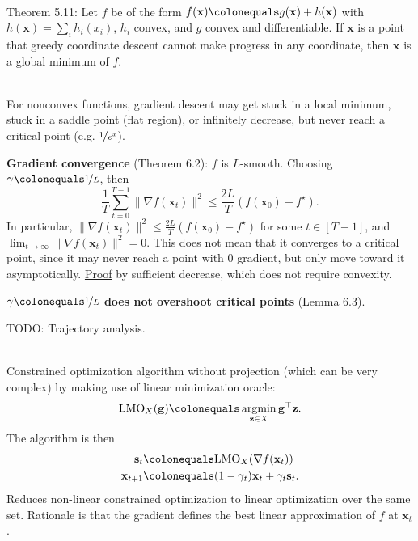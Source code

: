 \documentclass{article}
\DeclareMathOperator*{\argmin}{argmin}
\renewcommand{\vec}[1]{\mathbf{#1}}
\newcommand{\transpose}[1]{#1^\top}
\newenvironment{topic}[1]
{\textbf{\sffamily \colorbox{black}{\rlap{\textbf{\textcolor{white}{#1}}}\hspace{\linewidth}\hspace{-2\fboxsep}}} \\ \vspace{0.2cm}}
{}
\begin{document}
\begin{multicols*}{2}
\begin{topic}{5 Coordinate descent}
        Theorem 5.11: Let $f$ be of the form $f(\vec{x}) \colonequals g(\vec{x}) + h(\vec{x})$ with
        $h(\vec{x}) = \sum_{i} h_i(x_i)$, $h_i$ convex, and $g$ convex and differentiable. If $\vec{x}$ is
        a point that greedy coordinate descent cannot make progress in any coordinate, then $\vec{x}$ is a
        global minimum of $f$.
    \end{topic}

    \begin{topic}{6 Nonconvex functions}
        For nonconvex functions, gradient descent may get stuck in a local minimum, stuck in a saddle
        point (flat region), or infinitely decrease, but never reach a critical point (e.g. $\nicefrac{1}{e^x}$).

        \textbf{Gradient convergence} (Theorem 6.2): $f$ is $L$-smooth. Choosing $\gamma \colonequals \nicefrac{1}{L}$, then \[
            \frac{1}{T} \sum_{t=0}^{T-1} \| \nabla f(\vec{x}_t) \|^2 \leq \frac{2L}{T} (f(\vec{x}_0) - f^\star).
        \]
        In particular, $\| \nabla f(\vec{x}_t) \|^2 \leq \frac{2L}{T} (f(\vec{x}_0) - f^\star)$ for some $t
            \in [T-1]$, and $\lim_{t \to \infty} \| \nabla f(\vec{x}_t) \|^2 = 0$. This does not mean that it
        converges to a critical point, since it may never reach a point with 0 gradient, but only move
        toward it asymptotically. \underline{Proof} by sufficient decrease, which does not require
        convexity.

        \textbf{$\gamma \colonequals \nicefrac{1}{L}$ does not overshoot critical points} (Lemma 6.3).

        TODO: Trajectory analysis.
    \end{topic}

    \begin{topic}{7 The Frank-Wolfe algorithm}
        Constrained optimization algorithm without projection (which can be very complex) by making
        use of linear minimization oracle: \[
            \mathrm{LMO}_X(\vec{g}) \colonequals \argmin_{\vec{z} \in X} \transpose{\vec{g}} \vec{z}.
        \]
        The algorithm is then
        \begin{align*}
            \vec{s}_t     & \colonequals \mathrm{LMO}_X(\nabla f(\vec{x}_t))            \\
            \vec{x}_{t+1} & \colonequals (1 - \gamma_t) \vec{x}_t + \gamma_t \vec{s}_t.
        \end{align*}
        Reduces non-linear constrained optimization to linear optimization over the same set.
        Rationale is that the gradient defines the best linear approximation of $f$ at $\vec{x}_t$.


\end{topic}
\end{multicols*}
\end{document}
